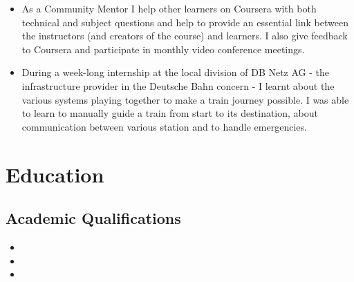 \documentclass[11pt,a4paper,sans]{moderncv}        %
\begin{document}
\begin{itemize}
\item{
{\vspace{3pt}
As a Community Mentor I help other learners on Coursera with both technical and subject questions and help to provide an essential link between the instructors (and creators of the course) and learners. I also give feedback to Coursera and participate in monthly video conference meetings.}}

\item{
{\vspace{3pt}
During a week-long internship at the local division of DB Netz AG - the infrastructure provider in the Deutsche Bahn concern - I learnt about the various systems playing together to make a train journey possible. I was able to
learn to manually guide a train from start to its destination, about communication between various station and to handle emergencies.}}


\end{itemize}

\section{Education}

\vspace{5pt}

\subsection{Academic Qualifications}

\vspace{5pt}

\begin{itemize}

\item{}

\item{}  %

\item{}

\end{itemize}
\end{document}
